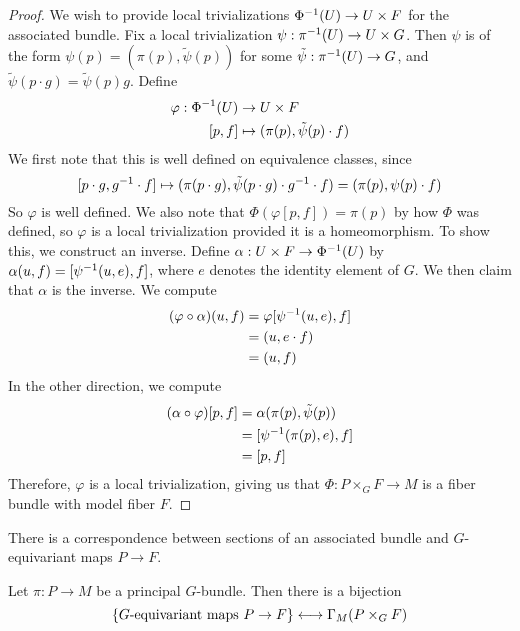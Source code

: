 \begin{proof}
We wish to provide local trivializations  $\Phi^{-1}(U) \to U \times F$ for the
associated bundle. Fix a local trivialization  $\psi : \pi^{-1}(U) \to U \times G$.
Then $\psi$ is of the form $\psi(p) = (\pi(p), \tilde{\psi}(p))$
for some $\tilde{\psi} : \pi^{-1}(U) \to G$, and
$\tilde{\psi}(p\cdot g) = \tilde{\psi}(p)g$.
Define
\begin{align*}
\varphi : \Phi^{-1}(U) &\to U \times F \\
[p,f] &\mapsto (\pi(p), \tilde{\psi}(p)\cdot f)
\end{align*}
We first note that this is well defined on equivalence classes, since
\[
[p\cdot g, g^{-1} \cdot f] \mapsto (\pi(p \cdot g), \tilde{\psi}(p \cdot g)
\cdot g^{-1} \cdot f)
= (\pi(p), \psi(p)\cdot f)
\]
So $\varphi$ is well defined. We also note that $\Phi(\varphi[p,f]) = \pi(p)$
by how $\Phi$ was defined, so $\varphi$ is a local trivialization provided
it is a homeomorphism. To show this, we construct an inverse.
Define $\alpha : U \times F \to \Phi^{-1}(U)$
by $\alpha(u,f) = [\psi^{-1}(u,e), f]$, where $e$ denotes the identity element
of $G$. We then claim that $\alpha$ is the inverse. We compute
%
\begin{align*}
(\varphi \circ \alpha)(u,f) &= \varphi[\psi^{-1}(u,e),f] \\
&= (u, e\cdot f)\\
&= (u,f)
\end{align*}
%
In the other direction, we compute
%
\begin{align*}
(\alpha \circ \varphi)[p,f] &= \alpha(\pi(p), \tilde{\psi}(p)) \\
&= [\psi^{-1}(\pi(p), e), f] \\
&= [p, f]
\end{align*}
%
Therefore, $\varphi$ is a local trivialization, giving us that
$\Phi: P \times_G F \to M$ is a fiber bundle with model fiber $F$.
%
\end{proof}
%
There is a correspondence between sections of an associated bundle and
$G$-equivariant maps $P \to F$.
%
\begin{prop}
Let $\pi : P \to M$ be a principal $G$-bundle. Then there is a bijection
\[
\left\lbrace G\text{-equivariant maps } P \to F \right\rbrace \longleftrightarrow \Gamma_M(P \times_G F)
\]
\end{prop}
%

